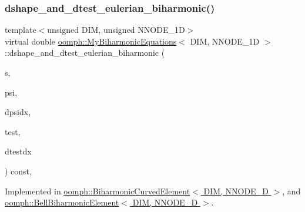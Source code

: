 \subsubsection{\texorpdfstring{dshape\+\_\+and\+\_\+dtest\+\_\+eulerian\+\_\+biharmonic()}{dshape\_and\_dtest\_eulerian\_biharmonic()}\hspace{0.1cm}{\footnotesize\ttfamily [1/2]}}
{\footnotesize\ttfamily template$<$unsigned D\+IM, unsigned N\+N\+O\+D\+E\+\_\+1D$>$ \\
virtual double \hyperlink{classoomph_1_1MyBiharmonicEquations}{oomph\+::\+My\+Biharmonic\+Equations}$<$ D\+IM, N\+N\+O\+D\+E\+\_\+1D $>$\+::dshape\+\_\+and\+\_\+dtest\+\_\+eulerian\+\_\+biharmonic (\begin{DoxyParamCaption}\item[{const Vector$<$ double $>$ \&}]{s,  }\item[{Shape \&}]{psi,  }\item[{D\+Shape \&}]{dpsidx,  }\item[{Shape \&}]{test,  }\item[{D\+Shape \&}]{dtestdx }\end{DoxyParamCaption}) const\hspace{0.3cm}{\ttfamily [protected]}, {}}



Implemented in \hyperlink{classoomph_1_1BiharmonicCurvedElement_a3dcacc1730a9bf9bf8f7396a795ce6b6}{oomph\+::\+Biharmonic\+Curved\+Element$<$ D\+I\+M, N\+N\+O\+D\+E\+\_\+D $>$}, and \hyperlink{classoomph_1_1BellBiharmonicElement_aaa8959c7456a75c15db4b42a70812304}{oomph\+::\+Bell\+Biharmonic\+Element$<$ D\+I\+M, N\+N\+O\+D\+E\+\_\+D $>$}.

\mbox{\label{classoomph_1_1MyBiharmonicEquations_a084eaadd62185dad622c7708862f023a}} 
